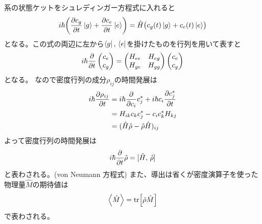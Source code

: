 \documentclass[11pt,dvipdfmx,a4paper]{jsarticle}
\begin{document}
系の状態ケットをシュレディンガー方程式に入れると
\begin{equation}
	i\hbar\qty(\pdv{c_g}{t}\ket{g}+\pdv{c_e}{t}\ket{e}) = \hat{H}\bigl(c_g (t) \ket{g} + c_e (t) \ket{e}\bigr)
\end{equation}
となる。この式の両辺に左から\(\bra{g},\,\bra{e}\)を掛けたものを行列を用いて表すと
\begin{equation}
	i\hbar\pdv{t}
	\begin{pmatrix}
		c_e\\
		c_g
	\end{pmatrix}
	=
	\begin{pmatrix}
		H_{ee} & H_{eg}\\
		H_{ge} & H_{gg}
	\end{pmatrix}
	\begin{pmatrix}
		c_e\\
		c_g
	\end{pmatrix}
\end{equation}
となる。
なので密度行列の成分\(\rho_{ij}\)の時間発展は
\begin{align}
	i\hbar\pdv{\rho_{ij}}{t} &= i\hbar\pdv{c_i}c_j^*+i\hbar c_i \pdv{c_j^*}{t}\\
	&= H_{ik} c_k c_j^* - c_i c_k^* H_{kj}\\
	&= (\hat{H}\hat{\rho}-\hat{\rho}\hat{H})_{ij}
\end{align}
よって密度行列の時間発展は
\begin{equation}
	i\hbar \pdv{t} \hat{\rho} = [\hat{H},\,\hat{\rho}]
\end{equation}
と表わされる。(von Neumann 方程式)
また、導出は省くが密度演算子を使った物理量\(\hat{M}\)の期待値は
\begin{equation}
	\ev{\hat{M}} = \tr[\hat{\rho}\hat{M}]
\end{equation}
で表わされる。
\end{document}
